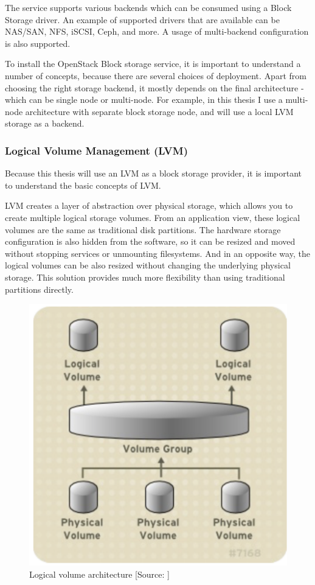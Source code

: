 The service supports various backends which can be consumed using a Block Storage driver. An example of supported drivers that are available can be NAS/SAN, NFS, iSCSI, Ceph, and more. A usage of multi-backend configuration is also supported. \cite{InstallGuide}

To install the OpenStack Block storage service, it is important to understand a number of concepts, because there are several choices of deployment. \cite{OperationsGuide} Apart from choosing the right storage backend, it mostly depends on the final architecture - which can be single node or multi-node. For example, in this thesis I use a multi-node architecture with separate block storage node, and will use a local LVM storage as a backend.

\subsubsection*{Logical Volume Management (LVM)}
Because this thesis will use an LVM as a block storage provider, it is important to understand the basic concepts of LVM.

LVM creates a layer of abstraction over physical storage, which allows you to create multiple logical storage volumes. From an application view, these logical volumes are the same as traditional disk partitions. The hardware storage configuration is also hidden from the software, so it can be resized and moved without stopping services or unmounting filesystems. And in an opposite way, the logical volumes can be also resized without changing the underlying physical storage. This solution provides much more flexibility than using traditional partitions directly. \cite{LVMPdf}

\begin{figure}[!h]
  \includegraphics[width=\textwidth]{fig/lvm_architecture.png}
  \caption{Logical volume architecture [Source: \cite{lvmArch}]}
  \label{fig:lvm_architecture}
\end{figure}

